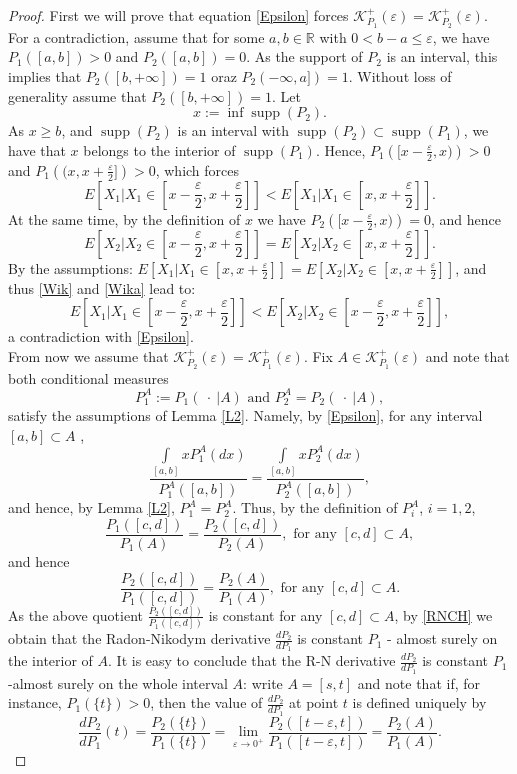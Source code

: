 \documentclass[sn-mathphys,Numbered,11pt]{sn-jnl}%
\theoremstyle{thmstyleone}%
\newcommand{\eps}{\varepsilon}
\newcommand{\R}{\mathbb{R}}
\newcommand{\KK}{\mathcal{K}}
\newcommand{\supp}{\operatorname{supp}}
\begin{document}
\begin{proof}
First we will prove that equation \eqref{Epsilon} forces $\KK_{P_1}^+(\eps)=\KK_{P_2}^+(\eps)$. For a contradiction, assume that for some $a,b\in\R$ with $0<b-a\leq\eps$, we have $P_1([a,b])>0$ and $P_2([a,b])=0$. As the support of $P_2$ is an interval, this implies that $P_2([b,+\infty])=1$ oraz $P_2(-\infty,a])=1$. Without loss of generality assume that $P_2([b,+\infty])=1$.
Let
$$x:=\inf \supp(P_2).$$
As $x\geq b$, and $\supp(P_2)$ is an interval with $\supp(P_2)\subset\supp(P_1)$, we have that $x$ belongs to the interior of  $\supp(P_1)$. Hence, $P_1\left([x-\frac{\eps}{2},x)\right)>0$ and $P_1\left((x,x+\frac{\eps}{2}]\right)>0$, which forces 
\begin{equation}\label{Wik}E[X_1|X_1\in [x-\frac{\eps}{2},x+\frac{\eps}{2}]]<E[X_1|X_1\in [x,x+\frac{\eps}{2}]].
\end{equation}
At the same time, by the definition of $x$ we have  $P_2\left([x-\frac{\eps}{2},x)\right)=0$, and hence
\begin{equation}\label{Wika}E[X_2|X_2\in [x-\frac{\eps}{2},x+\frac{\eps}{2}]]=E[X_2|X_2\in [x,x+\frac{\eps}{2}]].
\end{equation}
By the assumptions: $E[X_1|X_1\in [x,x+\frac{\eps}{2}]]=E[X_2|X_2\in [x,x+\frac{\eps}{2}]]$, and thus \eqref{Wik} and \eqref{Wika} lead to: 
$$E[X_1|X_1\in [x-\frac{\eps}{2},x+\frac{\eps}{2}]]<E[X_2|X_2\in [x-\frac{\eps}{2},x+\frac{\eps}{2}]],$$
a contradiction with \eqref{Epsilon}.\\
From now we assume that $\KK_{P_2}^+(\eps)= \KK_{P_1}^+(\eps)$. Fix $A\in \KK_{P_1}^+(\eps)$ and note that both conditional measures 
$$P_1^A:=P_{1}(\ \cdot\ |A)\mbox{ and }P_2^A=P_{2}(\ \cdot\ | A),$$
 satisfy the assumptions of Lemma \ref{L2}. Namely, by \eqref{Epsilon}, for any interval $[a,b]\subset A$ ,
$$\frac{\int\limits_{[a,b]}xP_1^A(dx)}{P_1^A([a,b])}=\frac{\int\limits_{[a,b]}xP_2^A(dx)}{P_2^A([a,b])},$$
and hence, by Lemma \ref{L2}, $P_1^A=P_2^A$.  Thus, by the definition of $P_i^A$, $i=1,2$,
$$\frac{P_1([c,d])}{P_1(A)}=\frac{P_2([c,d])}{P_2(A)},\mbox{ for any }[c,d]\subset A,$$
and hence
$$\frac{P_2([c,d])}{P_1([c,d])}=\frac{P_2(A)}{P_1(A)},\mbox{ for any }[c,d]\subset A.$$
As the above quotient  $\frac{P_2([c,d])}{P_1([c,d])}$ is constant for any $[c,d]\subset A$, by \eqref{RNCH} we obtain that the Radon-Nikodym derivative $\frac{dP_2}{dP_1}$ is constant $P_1$ - almost surely on the interior of $A$.  It is easy to conclude that the R-N derivative $\frac{dP_2}{dP_1}$ is constant $P_1$-almost surely on the whole interval $A$:  write $A=[s,t]$ and note that if, for instance, $P_1(\{t\})>0$, then  the value of $\frac{dP_2}{dP_1}$ at point $t$ is defined uniquely by
$$\frac{dP_2}{dP_1}(t)=\frac{P_2(\{t\})}{P_1(\{t\})}=\lim\limits_{\eps\to0^+}\frac{P_2([t-\eps,t])}{P_1([t-\eps,t])}=\frac{P_2(A)}{P_1(A)}.$$



\end{proof}
\end{document}
